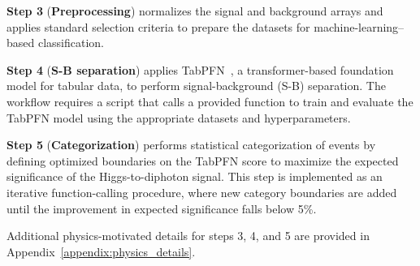 \documentclass[aps,prd,reprint,superscriptaddress]{revtex4-2}
\begin{document}
\textbf{Step 3} (\textbf{Preprocessing}) normalizes the signal and background arrays and applies standard selection criteria to prepare the datasets for machine-learning–based classification.

\textbf{Step 4} (\textbf{S-B separation}) applies TabPFN~\citep{Hollmann2025TabularFM}, a transformer-based foundation model for tabular data, to perform signal-background (S-B) separation. The workflow requires a script that calls a provided function to train and evaluate the TabPFN model using the appropriate datasets and hyperparameters.

\textbf{Step 5} (\textbf{Categorization}) performs statistical categorization of events by defining optimized boundaries on the TabPFN score to maximize the expected significance of the Higgs-to-diphoton signal. This step is implemented as an iterative function-calling procedure, where new category boundaries are added until the improvement in expected significance falls below 5\%.

Additional physics-motivated details for steps 3, 4, and 5 are provided in Appendix~\ref{appendix:physics_details}.

\end{document}
